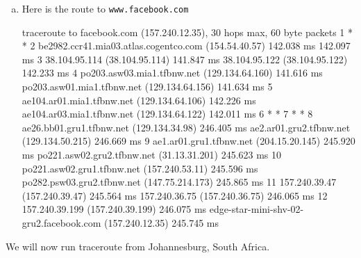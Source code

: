 \documentclass{article}
\begin{document}
\begin{enumerate}[a.]
\item Here is the route to {\tt www.facebook.com}
\begin{code}
traceroute to facebook.com (157.240.12.35), 30 hops max, 60 byte packets
 1  * *
 2  be2982.ccr41.mia03.atlas.cogentco.com (154.54.40.57)  142.038 ms  142.097 ms
 3  38.104.95.114 (38.104.95.114)  141.847 ms 38.104.95.122 (38.104.95.122)  142.233 ms
 4  po203.asw03.mia1.tfbnw.net (129.134.64.160)  141.616 ms po203.asw01.mia1.tfbnw.net (129.134.64.156)  141.634 ms
 5  ae104.ar01.mia1.tfbnw.net (129.134.64.106)  142.226 ms ae104.ar03.mia1.tfbnw.net (129.134.64.122)  142.011 ms
 6  * *
 7  * *
 8  ae26.bb01.gru1.tfbnw.net (129.134.34.98)  246.405 ms ae2.ar01.gru2.tfbnw.net (129.134.50.215)  246.669 ms
 9  ae1.ar01.gru1.tfbnw.net (204.15.20.145)  245.920 ms po221.asw02.gru2.tfbnw.net (31.13.31.201)  245.623 ms
10  po221.asw02.gru1.tfbnw.net (157.240.53.11)  245.596 ms po282.psw03.gru2.tfbnw.net (147.75.214.173)  245.865 ms
11  157.240.39.47 (157.240.39.47)  245.564 ms 157.240.36.75 (157.240.36.75)  246.065 ms
12  157.240.39.199 (157.240.39.199)  246.075 ms edge-star-mini-shv-02-gru2.facebook.com (157.240.12.35)  245.745 ms
\end{code}
\end{enumerate}

We will now run traceroute from Johannesburg, South Africa.
\end{document}
